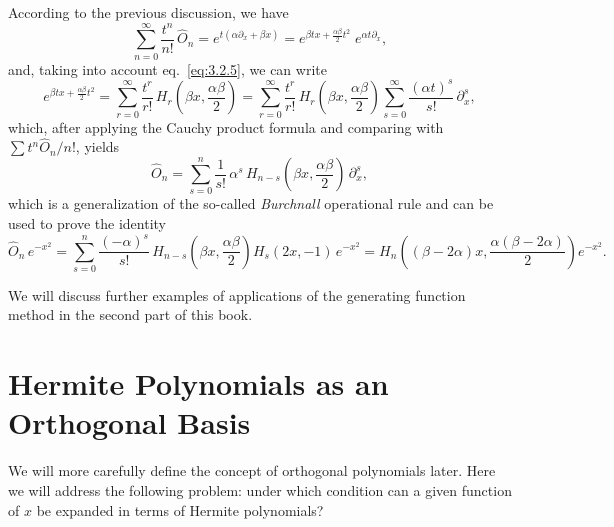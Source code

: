 According to the previous discussion, we have
\[
\sum_{n=0}^{\infty}\frac{t^n}{n!}\,\hat O_n
=e^{t(\alpha\partial_x+\beta x)}
=e^{\beta t x+\frac{\alpha\beta}{2}t^2}\;e^{\alpha t\partial_x},
\]
and, taking into account eq.~\eqref{eq:3.2.5}, we can write
\[
e^{\beta t x+\frac{\alpha\beta}{2}t^2}
=\sum_{r=0}^{\infty}\frac{t^r}{r!}\,
H_r\!\left(\beta x,\frac{\alpha\beta}{2}\right)
=\sum_{r=0}^{\infty}\frac{t^r}{r!}\,H_r\!\left(\beta x,\frac{\alpha\beta}{2}\right)
 \sum_{s=0}^{\infty}\frac{(\alpha t)^s}{s!}\,\partial_x^s,
\]
which, after applying the Cauchy product formula and comparing with
$\sum t^n\hat O_n/n!$, yields
\begin{equation}
\hat O_n=\sum_{s=0}^{n}\frac{1}{s!}\,
\alpha^s\,H_{n-s}\!\left(\beta x,\frac{\alpha\beta}{2}\right)\,\partial_x^s,
\label{eq:3.2.22}
\end{equation}
which is a generalization of the so-called \emph{Burchnall}
operational rule and can be used to prove the identity
\begin{equation}
\hat O_n\,e^{-x^2}
=\sum_{s=0}^{n}\frac{(-\alpha)^s}{s!}\,
H_{n-s}\!\left(\beta x,\frac{\alpha\beta}{2}\right)
H_s(2x,-1)\,e^{-x^2}
=H_n\!\left((\beta-2\alpha)x,\frac{\alpha(\beta-2\alpha)}{2}\right)e^{-x^2}.
\label{eq:3.2.23}
\end{equation}

We will discuss further examples of applications of the generating
function method in the second part of this book.

\section{Hermite Polynomials as an Orthogonal Basis}
\label{sec:3.3}

We will more carefully define the concept of orthogonal polynomials
later. Here we will address the following problem: under which
condition can a given function of $x$ be expanded in terms of
Hermite polynomials?

